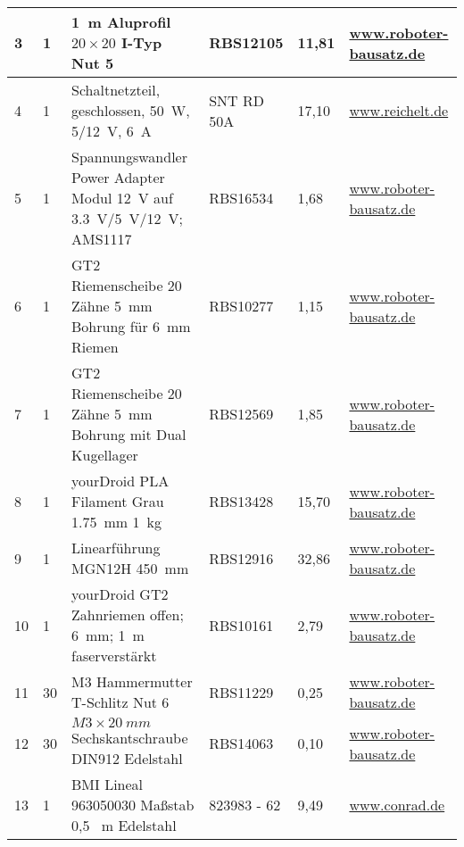 \begin{center}
\begin{tabularx}{\textwidth}{|p{0.4cm}|p{0.4cm}|X|X|p{1cm}|X|}
		3 & 1 & 1\ m Aluprofil $20 \times 20$ I-Typ Nut 5 & RBS12105 & 11,81 & \href{https://www.roboter-bausatz.de/p/1-meter-aluprofil-20x20-i-typ-nut-5}{www.roboter-bausatz.de} \\ 
		\hline
		4 & 1 & Schaltnetzteil, geschlossen, 50\ W, 5/12\ V, 6\ A & SNT RD 50A
		& 17,10 & \href{https://www.reichelt.de/sg/de/schaltnetzteil-geschlossen-50-w-5-12-v-6-a-snt-rd-50a-p137098.html}{www.reichelt.de} \\ 
		\hline
		5 & 1 & Spannungswandler Power Adapter Modul 12\ V auf 3.3\ V/5\ V/12\ V; AMS1117
		& RBS16534 & 1,68 & \href{https://www.roboter-bausatz.de/p/spannungswandler-power-adapter-modul-12v-auf-3.3v-5v-12v-ams1117}{www.roboter-bausatz.de} \\ 
		\hline
		6 & 1 & GT2 Riemenscheibe 20 Zähne 5\ mm Bohrung für 6\ mm Riemen & RBS10277 & 1,15 & \href{https://www.roboter-bausatz.de/p/gt2-riemenscheibe-20-zaehne-5mm-bohrung-fuer-6mm-riemen}{www.roboter-bausatz.de} \\ 
		\hline
		7 & 1 & GT2 Riemenscheibe 20 Zähne 5\ mm Bohrung mit Dual Kugellager & RBS12569 & 1,85 &	\href{https://www.roboter-bausatz.de/p/gt2-riemenscheibe-20-zaehne-5mm-bohrung-mit-dual-kugellager}{www.roboter-bausatz.de} \\ 
		\hline
		8 & 1 & yourDroid PLA Filament Grau 1.75\ mm 1\ kg  & RBS13428 & 15,70 & \href{https://www.roboter-bausatz.de/p/yourdroid-pla-filament-grau-1.75mm-1kg}{www.roboter-bausatz.de} \\ 
		\hline
		9 & 1 & Linearführung MGN12H 450\ mm & RBS12916 & 32,86 & \href{https://www.roboter-bausatz.de/p/linearfuehrung-mgn12h-450mm}{www.roboter-bausatz.de} \\
		\hline
		10 & 1 & yourDroid GT2 Zahnriemen offen; 6\ mm; 1\ m faserverstärkt & RBS10161 & 2,79 & \href{https://www.roboter-bausatz.de/p/yourdroid-gt2-zahnriemen-offen-6mm-1-meter-faserverstaerkt}{www.roboter-bausatz.de} \\
		\hline
		11 & 30 & M3 Hammermutter T-Schlitz Nut 6 &  RBS11229 & 0,25 & \href{https://www.roboter-bausatz.de/p/m3-hammermutter-t-schlitz-nut-6}{www.roboter-bausatz.de} \\
		\hline
		12 & 30 & $M3 \times 20 \ mm$ Sechskantschraube DIN912 Edelstahl & RBS14063 & 0,10 &
		\href{https://www.roboter-bausatz.de/p/m3x20mm-sechskantschraube-din912-edelstahl}{www.roboter-bausatz.de} \\
		\hline
		13 & 1 & BMI Lineal 963050030 Maßstab 0,5 \ m Edelstahl & 823983 - 62 & 9,49 & \href{https://www.conrad.de/de/p/bmi-lineal-963050030-massstab-0-5-m-edelstahl-823983.html}{www.conrad.de} \\

\end{tabularx}
\end{center}
